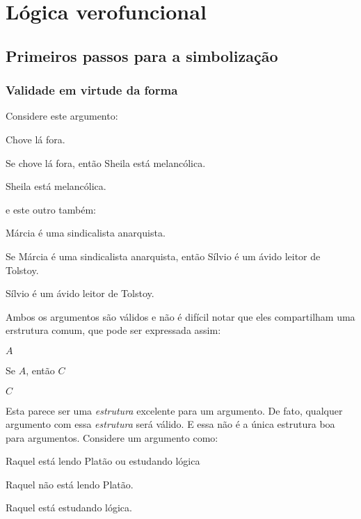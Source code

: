 \normalsize
\part{Lógica verofuncional}
\label{ch.TFL}

\chapter{Primeiros passos para a simbolização}

\section{Validade em  virtude da forma}\label{s:ValidityInVirtueOfForm}
Considere este argumento:
	\begin{earg}
		\item[] Chove lá fora.
		\item[] Se chove lá fora, então Sheila está melancólica.
		\item[\therefore] Sheila está melancólica.
	\end{earg}
e este outro também:
	\begin{earg}
		\item[] Márcia é uma sindicalista anarquista.
		\item[] Se Márcia é uma sindicalista anarquista, então Sílvio é um ávido leitor de Tolstoy.
		\item[\therefore] Sílvio é um ávido leitor de Tolstoy.
	\end{earg}
Ambos os argumentos são válidos e não é difícil notar que eles compartilham uma erstrutura comum, que pode ser expressada assim:
	\begin{earg}
		\item[] $A$
		\item[] Se $A$, então $C$
		\item[\therefore] $C$
	\end{earg}
Esta parece ser uma \emph{estrutura} excelente para um argumento.
De fato, qualquer argumento com essa \emph{estrutura} será válido.
E essa não é a única estrutura boa para argumentos.
Considere um argumento como:
	\begin{earg}
		\item[] Raquel está lendo Platão ou estudando lógica
		\item[] Raquel não está lendo Platão.
		\item[\therefore] Raquel está estudando lógica.
	\end{earg}
